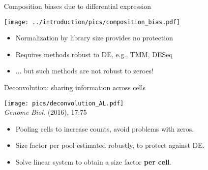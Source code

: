 \documentclass{beamer}
\begin{document}
\begin{frame}{Composition biases due to differential expression}
\begin{center}
\texttt{[image: ../introduction/pics/composition\_bias.pdf]}
\end{center}
\begin{itemize}
\item Normalization by library size provides no protection
\item Requires methods robust to DE, e.g., TMM, DESeq
\item ... but such methods are not robust to zeroes!
\end{itemize}
\end{frame}

%
%

\begin{frame}{Deconvolution: sharing information across cells}
    \begin{center}
        \texttt{[image: pics/deconvolution\_AL.pdf]} \\
    {\tiny \emph{Genome Biol.} (2016), 17:75}
    \end{center}
    \vspace{-0.1in}
    \begin{itemize}
        \item Pooling cells to increase counts, avoid problems with zeros.
        \item Size factor per pool estimated robustly, to protect against DE.
        \item Solve linear system to obtain a size factor \textbf{per cell}.
    \end{itemize}
\end{frame}
\end{document}
